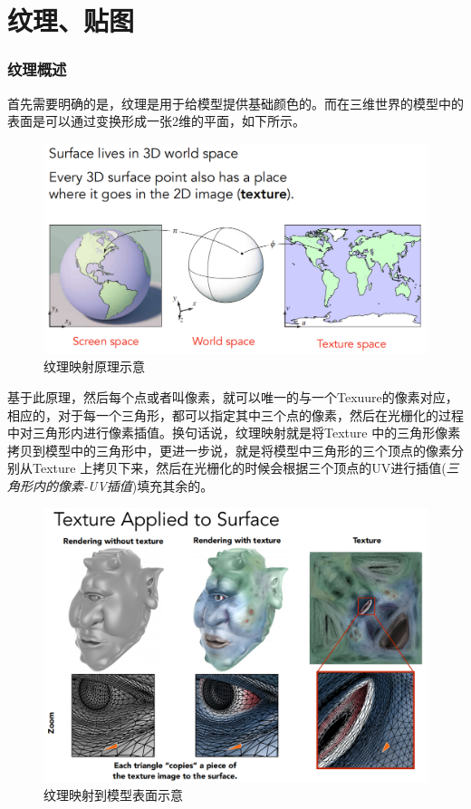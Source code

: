 \documentclass[UTF8,a4paper,12pt]{ctexbook}
\begin{document}
			
\chapter{纹理、贴图}
	\subsection{纹理概述}
		首先需要明确的是，纹理是用于给模型提供基础颜色的。而在三维世界的模型中的表面是可以通过变换形成一张2维的平面，如下所示。
	
		\begin{figure}[H]
			\centering
			\includegraphics[width=\linewidth]{TextureMapping01}
			\caption{纹理映射原理示意}
		\end{figure}
		
		基于此原理，然后每个点或者叫像素，就可以唯一的与一个Texuure的像素对应，相应的，对于每一个三角形，都可以指定其中三个点的像素，然后在光栅化的过程中对三角形内进行像素插值。换句话说，纹理映射就是将Texture 中的三角形像素拷贝到模型中的三角形中，更进一步说，就是将模型中三角形的三个顶点的像素分别从Texture 上拷贝下来，然后在光栅化的时候会根据三个顶点的UV进行插值(\textit{三角形内的像素-UV插值})填充其余的。

		\begin{figure}[H]
			\centering
			\includegraphics[width=\linewidth]{TextureMapping02}
			\caption{纹理映射到模型表面示意}
		\end{figure}
\end{document}
